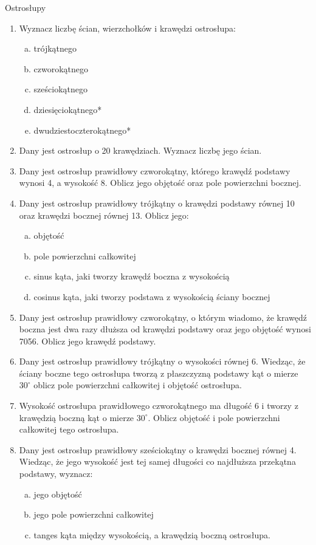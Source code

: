 \documentclass[12pt,a4paper]{article}
\begin{document}
	\newpage
	\begin{center}
		\large Ostrosłupy
	\end{center}
	\begin{enumerate}[1.]
	\item Wyznacz liczbę ścian, wierzchołków i krawędzi ostrosłupa:
	\begin{enumerate}[a)]
		\item trójkątnego
		\item czworokątnego
		\item sześciokątnego
		\item dziesięciokątnego*
		\item dwudziestoczterokątnego*
	\end{enumerate}
	
	\item Dany jest ostrosłup o 20 krawędziach. Wyznacz liczbę jego ścian.

	\item Dany jest ostrosłup prawidłowy czworokątny, którego krawędź podstawy wynosi 4, a wysokość 8. Oblicz jego objętość oraz pole powierzchni bocznej.
	
	\item Dany jest ostrosłup prawidłowy trójkątny o krawędzi podstawy równej 10 oraz krawędzi bocznej równej 13. Oblicz jego:
	\begin{enumerate}[a)]
		\item objętość
		\item pole powierzchni całkowitej
		\item sinus kąta, jaki tworzy krawędź boczna z wysokością
		\item cosinus kąta, jaki tworzy podstawa z wysokością ściany bocznej
	\end{enumerate}

	\item Dany jest ostrosłup prawidłowy czworokątny, o którym wiadomo, że krawędź boczna jest dwa razy dłuższa od krawędzi podstawy oraz jego objętość wynosi 7056. Oblicz jego krawędź podstawy.

	\item Dany jest ostrosłup prawidłowy trójkątny o wysokości równej 6. Wiedząc, że ściany boczne tego ostrosłupa tworzą z płaszczyzną podstawy kąt o mierze $30^\circ$ oblicz pole powierzchni całkowitej i objętość ostrosłupa.

	\item Wysokość ostrosłupa prawidłowego czworokątnego ma długość 6 i tworzy z krawędzią boczną kąt o mierze $30^\circ$. Oblicz objętość i pole powierzchni całkowitej tego ostrosłupa.

	\item Dany jest ostrosłup prawidłowy sześciokątny o krawędzi bocznej równej 4. Wiedząc, że jego wysokość jest tej samej długości co najdłuższa przekątna podstawy, wyznacz:
	\begin{enumerate}[a)]
		\item jego objętość
		\item jego pole powierzchni całkowitej
		\item tanges kąta między wysokością, a krawędzią boczną ostrosłupa.
	\end{enumerate}

	\end{enumerate}
\end{document}
